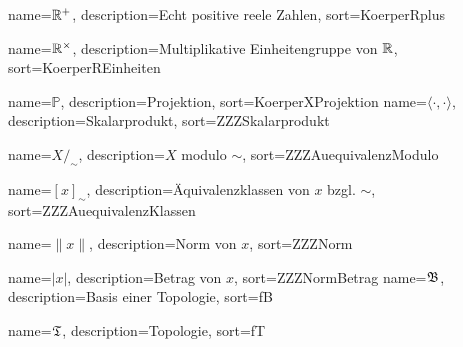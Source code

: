 {
  name={\ensuremath{\mdr^+}},
  description={Echt positive reele Zahlen},
  sort=KoerperRplus
}

{
  name={\ensuremath{\mdr^\times}},
  description={Multiplikative Einheitengruppe von $\mathbb{R}$},
  sort=KoerperREinheiten
}

{
  name={\ensuremath{\mathbb{P}}},
  description={Projektion},
  sort=KoerperXProjektion
}
{
  name={\ensuremath{\langle \cdot , \cdot \rangle}},
  description={Skalarprodukt},
  sort=ZZZSkalarprodukt
}

{
  name={\ensuremath{X /_\sim}},
  description={$X$ modulo $\sim$},
  sort=ZZZAuequivalenzModulo
}

{
  name={\ensuremath{[x]_\sim}},
  description={Äquivalenzklassen von $x$ bzgl. $\sim$},
  sort=ZZZAuequivalenzKlassen
}

{
  name={\ensuremath{\| x \|}},
  description={Norm von $x$},
  sort=ZZZNorm
}

{
  name={\ensuremath{| x |}},
  description={Betrag von $x$},
  sort=ZZZNormBetrag
}
{
  name={\ensuremath{\fB}},
  description={Basis einer Topologie},
  sort=fB
}

{
  name={\ensuremath{\fT}},
  description={Topologie},
  sort=fT
}


\renewcommand*{\glossaryname}{\glossarName}

\glsaddall
\printglossaries

